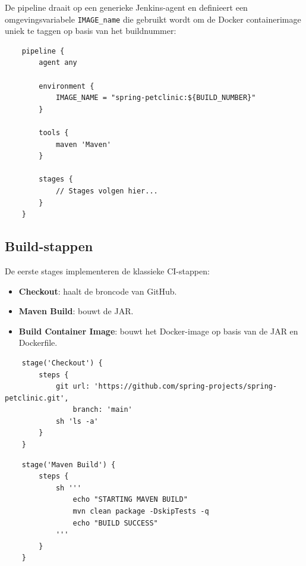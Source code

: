 De pipeline draait op een generieke Jenkins-agent en definieert een omgevingsvariabele \texttt{IMAGE\_name} die gebruikt wordt om de Docker containerimage uniek te taggen op basis van het buildnummer:

\begin{listing}[h]
    \caption{Basisconfiguratie van de Jenkins-pipeline}
    \label{lst:jenkins-env}
    \begin{verbatim}
    pipeline {
        agent any
    
        environment {
            IMAGE_NAME = "spring-petclinic:${BUILD_NUMBER}"
        }
    
        tools {
            maven 'Maven'
        }
    
        stages {
            // Stages volgen hier...
        }
    }
    \end{verbatim}
\end{listing}

\subsection{Build-stappen}

De eerste stages implementeren de klassieke CI-stappen:
   
\begin{itemize}
    \item \textbf{Checkout}: haalt de broncode van GitHub.
    \item \textbf{Maven Build}: bouwt de JAR.
    \item \textbf{Build Container Image}: bouwt het Docker-image op basis van de JAR en Dockerfile.
\end{itemize}

\begin{listing}[h]
    \caption{Checkout-stage in Jenkins pipeline}
    \label{lst:checkout}
    \begin{verbatim}
    stage('Checkout') {
        steps {
            git url: 'https://github.com/spring-projects/spring-petclinic.git',
                branch: 'main'
            sh 'ls -a'
        }
    }
    \end{verbatim}
  \end{listing}
  
  \begin{listing}[h]
    \caption{Maven build-stage}
    \label{lst:maven-build}
    \begin{verbatim}
    stage('Maven Build') {
        steps {
            sh '''
                echo "STARTING MAVEN BUILD"
                mvn clean package -DskipTests -q
                echo "BUILD SUCCESS"
            '''
        }
    }
    \end{verbatim}
  \end{listing}
  
